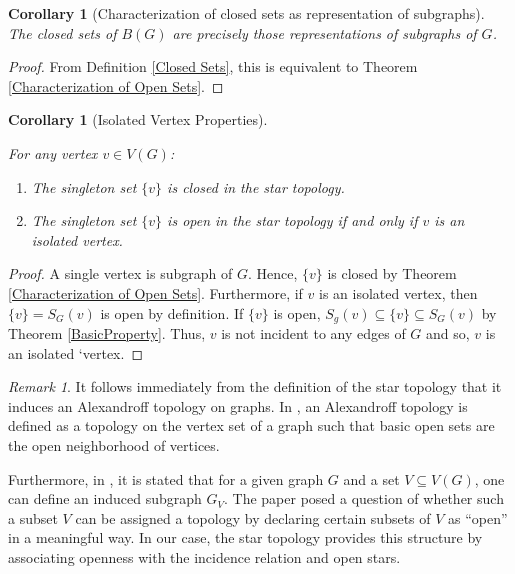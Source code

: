 \documentclass{amsart}
\newtheorem{corollary}[theorem]{Corollary}
\theoremstyle{definition}
\theoremstyle{remark}
\newtheorem{remark}[theorem]{Remark}
\numberwithin{equation}{section}
\begin{document}
	\begin{corollary}[Characterization of closed sets as representation of subgraphs]
		The closed sets of \(B(G)\) are precisely those representations of
		subgraphs of \(G\).
	\end{corollary}
	\begin{proof}
		From Definition \ref{Closed Sets}, this is equivalent to Theorem
		\ref{Characterization of Open Sets}.
	\end{proof}
	
	\begin{corollary}[Isolated Vertex Properties]
		\label{IsolatedVertexProperties}
		
		For any vertex \( v \in V(G) \):
		\begin{enumerate}
			\item The singleton set \(\{v\}\) is closed in the star topology.
			\item The singleton set \(\{v\}\) is open in the star topology if
			and only if \( v \) is an isolated vertex.
		\end{enumerate}
	\end{corollary}
	
	\begin{proof}
		A single vertex is subgraph of \(G\). Hence, \(\{v\}\) is closed by
		Theorem \ref{Characterization of Open Sets}. Furthermore, if \(v\) is an isolated
		vertex, then \(\{v\} =  S_G(v)\) is open by definition. If \(\{v\}\) is open,
		\(S_g(v) \subseteq \{v\} \subseteq S_G(v)\) by Theorem \ref{BasicProperty}. Thus,
		\(v\) is not incident to any edges of \(G\) and so, \(v\) is an isolated `vertex.
	\end{proof}
	
	\begin{remark}
		It follows immediately from the definition of the star topology that it induces
		an Alexandroff topology on graphs. In \cite{JafarianAmiriJafarzadeh2013}, an
		Alexandroff topology is defined as a topology on the vertex set of a graph such
		that basic open sets are the open neighborhood of vertices.
		
		Furthermore, in \cite{NoglySchladt1996}, it is stated that for a given graph \( G
		\) and a set \( V \subseteq V(G) \), one can define an induced subgraph \( G_V
		\). The paper posed a question of whether such a subset \( V \) can be assigned
		a topology by declaring certain subsets of \( V \) as ``open'' in a meaningful way.
		In our case, the star topology provides this structure by associating openness
		with the incidence relation and open stars.
	\end{remark}
	
\end{document}
